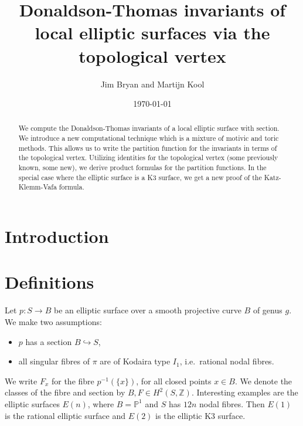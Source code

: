 \documentclass{amsart}
\title{Donaldson-Thomas invariants of local elliptic surfaces via the topological vertex}
\author{Jim Bryan and Martijn Kool}
\date{\today}
\theoremstyle{definition}
\newcommand{\ZZ} {\mathbb{Z}}		%
\newcommand{\PP} {\mathbb{P}}
\begin{document}
\begin{abstract}

We compute the Donaldson-Thomas invariants of a local elliptic surface
with section. We introduce a new computational technique which is a
mixture of motivic and toric methods. This allows us to write the
partition function for the invariants in terms of the topological
vertex. Utilizing identities for the topological vertex (some
previously known, some new), we derive product formulas for the
partition functions. In the special case where the elliptic surface is
a K3 surface, we get a new proof of the Katz-Klemm-Vafa formula.
\end{abstract}

\maketitle 





\section{Introduction}

\section{Definitions}

Let $p : S \rightarrow B$ be an elliptic surface over a smooth projective curve $B$ of genus $g$. We make two assumptions:
\begin{itemize}
\item $p$ has a section $B \hookrightarrow S$,
\item all singular fibres of $\pi$ are of Kodaira type $I_1$, i.e.~rational nodal fibres. 
\end{itemize}
We write $F_x$ for the fibre $p^{-1}(\{x\})$, for all closed points $x \in B$. We denote the classes of the fibre and section by $B, F \in H^2(S,\ZZ)$. Interesting examples are the elliptic surfaces $E(n)$, where $B = \PP^1$ and $S$ has $12n$ nodal fibres. Then $E(1)$ is the rational elliptic surface and $E(2)$ is the elliptic K3 surface.
\end{document}
